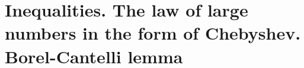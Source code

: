 \documentclass[12pt,letterpaper]{report}
\begin{document}
\chapter{Inequalities. The law of large numbers in the form of Chebyshev.
Borel-Cantelli lemma}
\end{document}
